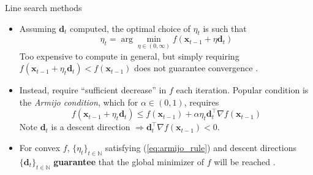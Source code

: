 \documentclass{beamer}
\numberwithin{equation}{section}
\newcommand{\aref}[1]{\alert{\ref{#1}}}
\begin{document}
\begin{frame}{Line search methods}
    \begin{itemize}
        \item
        Assuming $ \mathbf{d}_t $ computed, the optimal choice of $ \eta_t $
        is such that
        \begin{equation} \label{eq:exact_line_search}
            \eta_t = \arg\min_{\eta \in (0, \infty)}
            f(\mathbf{x}_{t - 1} + \eta\mathbf{d}_t)
        \end{equation}
        Too expensive to compute in general, but simply requiring
        $ f(\mathbf{x}_{t - 1} + \eta_t\mathbf{d}_t) < f(\mathbf{x}_{t - 1}) $
        does not guarantee convergence \cite{nocedal_opt}.

        \item
        Instead, require ``sufficient decrease'' in $ f $ each iteration.
        Popular condition is the \textit{Armijo condition}, which for
        $ \alpha \in (0, 1) $, requires
        \begin{equation} \label{eq:armijo_rule}
            f(\mathbf{x}_{t - 1} + \eta_t\mathbf{d}_t) \le
            f(\mathbf{x}_{t - 1}) + \alpha\eta_t\mathbf{d}_t^\top
            \nabla f(\mathbf{x}_{t - 1})
        \end{equation}
        Note $ \mathbf{d}_t $ is a descent direction $ \Rightarrow
        \mathbf{d}_t^\top\nabla f(\mathbf{x}_{t - 1}) < 0 $.

        \item
        For convex $ f $, $ \{\eta_t\}_{t \in \mathbb{N}} $ satisfying
        (\aref{eq:armijo_rule}) and descent directions
        $ \{\mathbf{d}_t\}_{t \in \mathbb{N}} $ \textbf{guarantee} that the
        global minimizer of $ f $ will be reached \cite{stat_learn_sparsity}.
    \end{itemize}
\end{frame}
\end{document}
